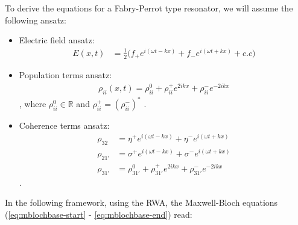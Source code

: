\documentclass[10pt,english,fleqn]{article}%
\begin{document}
To derive the equations for a Fabry-Perrot type resonator, we will assume the following ansatz:

\begin{itemize}
 \item {Electric field ansatz: 
    \begin{align}
	E(x,t) &= \frac{1}{2} \big ( f_{+} e^{i(\omega t-kx)} + f_{-} e^{i(\omega t+kx)} + c.c \big )
    \end{align}}
 \item {Population terms ansatz: 
    \begin{align}
       \rho_{ii}(x,t) = \rho_{ii}^0 + \rho_{ii}^+ e^{2ikx} + \rho_{ii}^-e^{-2ikx}
    \end{align} , where $\rho_{ii}^0 \in \mathbb{R} $  and  $\rho_{ii}^+ = (\rho_{ii}^-)^*$ .  }
  \item {Coherence terms ansatz:
    \begin{align}
      \rho_{32} &= \eta^+e^{i(\omega t - kx)} + \eta^-e^{i(\omega t + kx)} \nonumber \\
      \rho_{21'} &= \sigma^+e^{i(\omega t - kx)} + \sigma^-e^{i(\omega t + kx)} \nonumber \\
      \rho_{31'} &= \rho_{31'}^0 + \rho_{31'}^+ e^{2ikx} +  \rho_{31'}^{-} e^{-2ikx} 
    \end{align}.
    }
\end{itemize}

In the following framework, using the RWA, the Maxwell-Bloch equations (\ref{eq:mblochbase-start} - \ref{eq:mblochbase-end}) read: 
\end{document}
